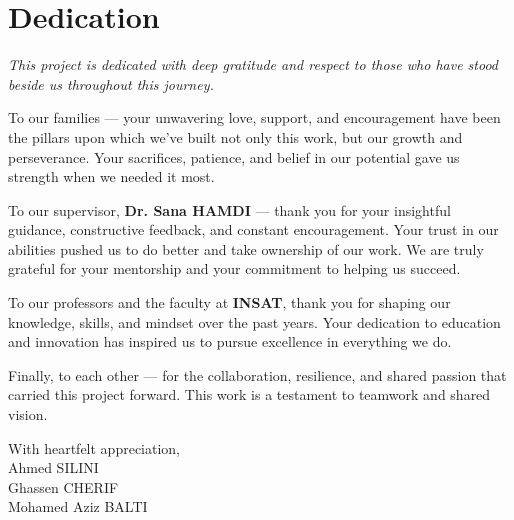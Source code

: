 \chapter*{Dedication}

\begin{center}
\begin{minipage}{0.9\textwidth}
\itshape
This project is dedicated with deep gratitude and respect to those who have stood beside us throughout this journey.

\vspace{0.4cm}

To our families — your unwavering love, support, and encouragement have been the pillars upon which we’ve built not only this work, but our growth and perseverance. Your sacrifices, patience, and belief in our potential gave us strength when we needed it most.

\vspace{0.4cm}

To our supervisor, \textbf{Dr. Sana HAMDI} — thank you for your insightful guidance, constructive feedback, and constant encouragement. Your trust in our abilities pushed us to do better and take ownership of our work. We are truly grateful for your mentorship and your commitment to helping us succeed.

\vspace{0.4cm}

To our professors and the faculty at \textbf{INSAT}, thank you for shaping our knowledge, skills, and mindset over the past years. Your dedication to education and innovation has inspired us to pursue excellence in everything we do.

\vspace{0.4cm}

Finally, to each other — for the collaboration, resilience, and shared passion that carried this project forward. This work is a testament to teamwork and shared vision.

\vspace{0.4cm}

With heartfelt appreciation, \\
Ahmed SILINI \\
Ghassen CHERIF \\
Mohamed Aziz BALTI
\end{minipage}
\end{center}
